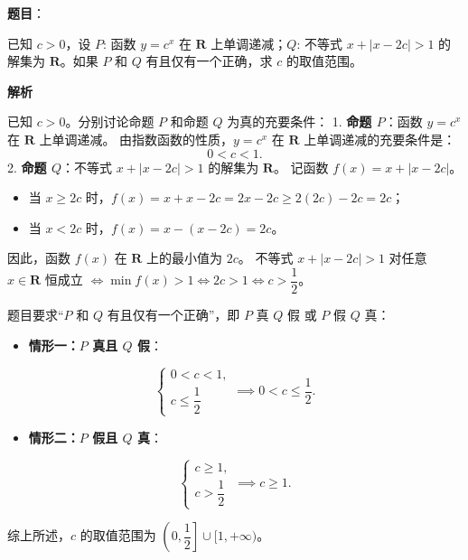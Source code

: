 \begin{answer}

\textbf{题目}：

已知 $c > 0$，设 $P$: 函数 $y = c^x$ 在 $\mathbf{R}$ 上单调递减；$Q$: 不等式 $x + |x - 2c| > 1$ 的解集为 $\mathbf{R}$。如果 $P$ 和 $Q$ 有且仅有一个正确，求 $c$ 的取值范围。

\textbf{解析}

已知 $c > 0$。分别讨论命题 $P$ 和命题 $Q$ 为真的充要条件：
1. \textbf{命题 $P$}：函数 $y = c^x$ 在 $\mathbf{R}$ 上单调递减。
   由指数函数的性质，$y = c^x$ 在 $\mathbf{R}$ 上单调递减的充要条件是：
\nopagebreak[4]
\[0 < c < 1.\]
2. \textbf{命题 $Q$}：不等式 $x + |x - 2c| > 1$ 的解集为 $\mathbf{R}$。
   记函数 $f(x) = x + |x - 2c|$。
\begin{itemize}
\item 当 $x \ge 2c$ 时，$f(x) = x + x - 2c = 2x - 2c \ge 2(2c) - 2c = 2c$；
\item 当 $x < 2c$ 时，$f(x) = x - (x - 2c) = 2c$。
\end{itemize}
   因此，函数 $f(x)$ 在 $\mathbf{R}$ 上的最小值为 $2c$。
   不等式 $x + |x - 2c| > 1$ 对任意 $x \in \mathbf{R}$ 恒成立 $\iff \min f(x) > 1 \iff 2c > 1 \iff c > \dfrac{1}{2}$。

题目要求“$P$ 和 $Q$ 有且仅有一个正确”，即 $P$ 真 $Q$ 假 或 $P$ 假 $Q$ 真：
\begin{itemize}
\item \textbf{情形一：$P$ 真且 $Q$ 假}：
\end{itemize}
\nopagebreak[4]
\[\begin{cases} 0 < c < 1, \\ c \le \dfrac{1}{2} \end{cases} \implies 0 < c \le \frac{1}{2}.\]
\begin{itemize}
\item \textbf{情形二：$P$ 假且 $Q$ 真}：
\end{itemize}
\nopagebreak[4]
\[\begin{cases} c \ge 1, \\ c > \dfrac{1}{2} \end{cases} \implies c \ge 1.\]

综上所述，$c$ 的取值范围为 $\left(0, \dfrac{1}{2}\right] \cup [1, +\infty)$。

\gkanswer{答案：$\left(0, \dfrac{1}{2}\right] \cup [1, +\infty)$}

\end{answer}
